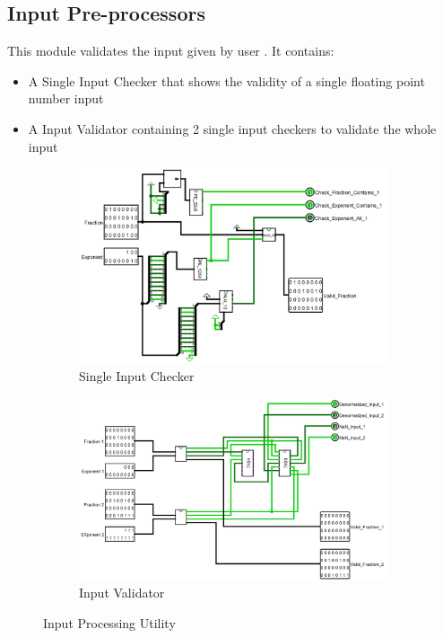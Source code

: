 \documentclass[12pt]{article}
\begin{document}
\subsection{Input Pre-processors}
This module validates the input given by user . It contains:
\begin{itemize}
    \item A Single Input Checker that shows the validity of a single floating point number input
    \item A Input Validator containing 2 single input checkers to validate the whole input
\end{itemize}
\begin{figure}[H]
\centering
  \begin{subfigure}[b]{\textwidth}
  \includegraphics[width=\textwidth]{Single_Input_Checker.jpg}
  \caption{Single Input Checker}
  \label{fig:inpcheck}
  \end{subfigure}
  
 \begin{subfigure}[b]{\textwidth}
  \includegraphics[width=\textwidth]{Input_Validator.jpg}
  \caption{Input Validator}
  \label{fig:inpval}
  \end{subfigure}
 \caption{Input Processing Utility}\label{fig:inpproc}
\end{figure}
\newpage
\end{document}
